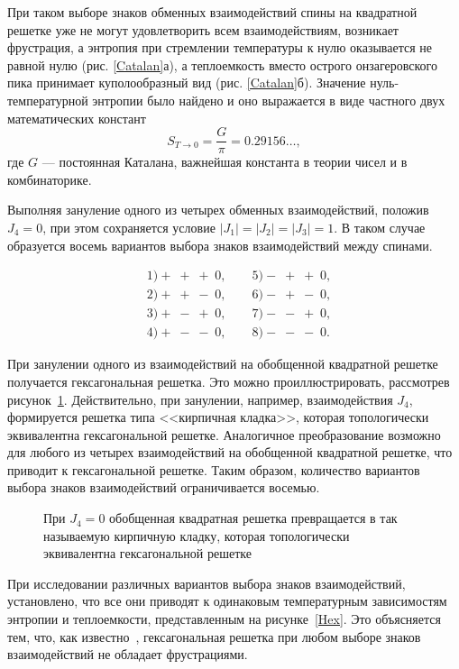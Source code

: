 При таком выборе знаков обменных взаимодействий спины на квадратной решетке уже не могут удовлетворить всем взаимодействиям, возникает фрустрация, а энтропия при стремлении температуры к нулю оказывается не равной нулю (рис. \ref{Catalan}а), а теплоемкость вместо острого онзагеровского пика принимает куполообразный вид (рис. \ref{Catalan}б). Значение нуль-температурной энтропии было найдено и оно выражается в виде частного двух математических констант
\begin{equation}
	S_{T\rightarrow 0} = \frac{G}{\pi} = 0.29156\dots,
	\label{g}
\end{equation} 
где $G$ --- постоянная Каталана, важнейшая константа в теории чисел и в комбинаторике.

Выполняя зануление одного из четырех обменных взаимодействий, положив $J_4 = 0$, при этом сохраняется условие $|J_1| = |J_2| = |J_3| = 1$. В таком случае образуется восемь вариантов выбора знаков взаимодействий между спинами.

\begin{align*}
	&1) +\;+\;+\;0, \qquad   5) -\;+\;+\;0, \\
	&2) +\;+\;-\;0, \qquad  6) -\;+\;-\;0, \\
	&3) +\;-\;+\;0, \qquad  7) -\;-\;+\;0, \\
	&4) +\;-\;-\;0, \qquad  8) -\;-\;-\;0.
\end{align*}

При занулении одного из взаимодействий на обобщенной квадратной решетке получается гексагональная решетка. Это можно проиллюстрировать, рассмотрев рисунок~\ref{hexTranf}. Действительно, при занулении, например, взаимодействия $J_4$, формируется решетка типа <<кирпичная кладка>>, которая топологически эквивалентна гексагональной решетке. Аналогичное преобразование возможно для любого из четырех взаимодействий на обобщенной квадратной решетке, что приводит к гексагональной решетке. Таким образом, количество вариантов выбора знаков взаимодействий ограничивается восемью.

\begin{figure}[h]
	\caption{При $J_4 = 0$ обобщенная квадратная решетка превращается в так называемую кирпичную кладку, которая топологически эквивалентна гексагональной решетке}
	\label{hexTranf}
\end{figure}

При исследовании различных вариантов выбора знаков взаимодействий, установлено, что все они приводят к одинаковым температурным зависимостям энтропии и теплоемкости, представленным на рисунке~\ref{Hex}. Это объясняется тем, что, как известно~\cite{houtapell1950}, гексагональная решетка при любом выборе знаков взаимодействий не обладает фрустрациями.

